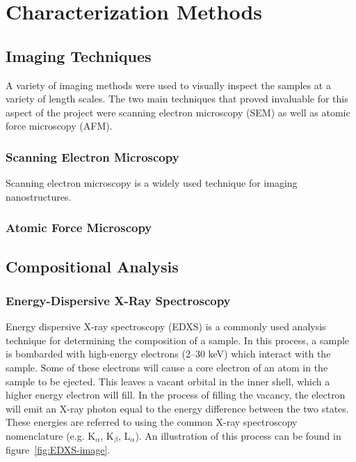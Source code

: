 \chapter{Characterization Methods}
\label{ch:characterization}
\thispagestyle{empty}


\section{Imaging Techniques}

A variety of imaging methods were used to visually inspect the samples at a variety of length scales. The two main techniques that proved invaluable for this aspect of the project were scanning electron microscopy (SEM) as well as atomic force microscopy (AFM). 


\subsection{Scanning Electron Microscopy}

Scanning electron microscopy is a widely used technique for imaging nanostructures. 

\lipsum


	
\subsection{Atomic Force Microscopy}
	
\lipsum


\section{Compositional Analysis}


\subsection{Energy-Dispersive X-Ray Spectroscopy}

Energy dispersive X-ray spectroscopy (EDXS) is a commonly used analysis technique for determining the composition of a sample. In this process, a sample is bombarded with high-energy electrons (2--30 keV) which interact with the sample. Some of these electrons will cause a core electron of an atom in the sample to be ejected. This leaves a vacant orbital in the inner shell, which a higher energy electron will fill. In the process of filling the vacancy, the electron will emit an X-ray photon equal to the energy difference between the two states. These energies are referred to using the common X-ray spectroscopy nomenclature (e.g. K$_{\alpha}$, K$_{\beta}$, L$_{\alpha}$). An illustration of this process can be found in figure~\ref{fig:EDXS-image}.  

